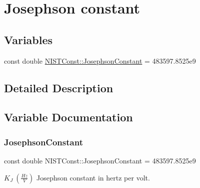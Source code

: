 \hypertarget{group___n_i_s_t_const-_josephson_constant}{}\section{Josephson constant}
\label{group___n_i_s_t_const-_josephson_constant}
\subsection*{Variables}
\begin{DoxyCompactItemize}
\item 
const double \mbox{\hyperlink{group___n_i_s_t_const-_josephson_constant_gae9f3553a6a6c5eed3df61ad33277cab8}{N\+I\+S\+T\+Const\+::\+Josephson\+Constant}} = 483597.\+8525e9
\end{DoxyCompactItemize}


\subsection{Detailed Description}


\subsection{Variable Documentation}
\mbox{\label{group___n_i_s_t_const-_josephson_constant_gae9f3553a6a6c5eed3df61ad33277cab8}} 
\subsubsection{\texorpdfstring{Josephson\+Constant}{JosephsonConstant}}
{\footnotesize\ttfamily const double N\+I\+S\+T\+Const\+::\+Josephson\+Constant = 483597.\+8525e9}

$K_J \ (\frac{Hz}{V})$ Josephson constant in hertz per volt. 